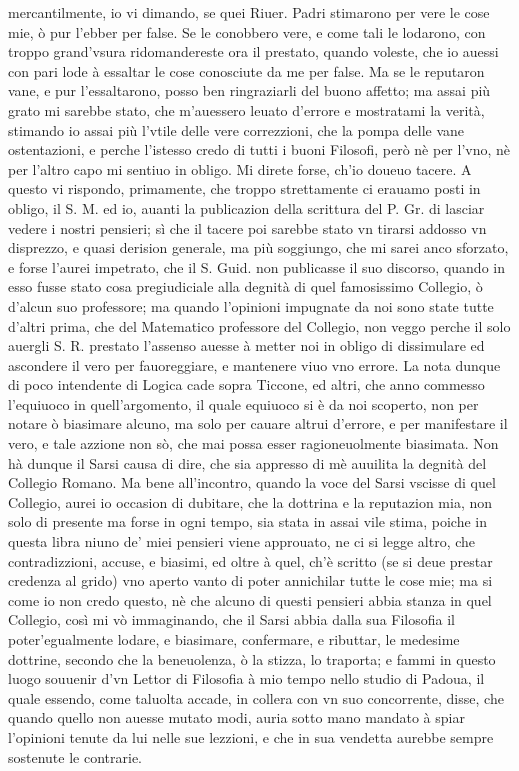 \documentclass[11pt,twoside,openany]{book}
\begin{document}
mercantilmente, io vi dimando, se quei Riuer. Padri stimarono per vere le cose mie, ò pur l'ebber per false. Se le conobbero vere, e come tali le lodarono, con troppo grand'vsura ridomandereste ora il prestato, quando voleste, che io auessi con pari lode à essaltar le cose conosciute da me per false. Ma se le reputaron vane, e pur l'essaltarono, posso ben ringraziarli del buono affetto; ma assai più grato mi sarebbe stato, che m'auessero leuato d'errore e mostratami la verità, stimando io assai più l'vtile delle vere correzzioni, che la pompa delle vane ostentazioni, e perche l'istesso credo di tutti i buoni Filosofi, però nè per l'vno, nè per l'altro capo mi sentiuo in obligo. Mi direte forse, ch'io doueuo tacere. A questo vi rispondo, primamente, che troppo strettamente ci erauamo posti in obligo, il S. M. ed io, auanti la publicazion della scrittura del P. Gr. di lasciar vedere i nostri pensieri; sì che il tacere poi sarebbe stato vn tirarsi addosso vn disprezzo, e quasi derision generale, ma più soggiungo, che mi sarei anco sforzato, e forse l'aurei impetrato, che il S. Guid. non publicasse il suo discorso, quando in esso fusse stato cosa pregiudiciale alla degnità di quel famosissimo Collegio, ò d'alcun suo professore; ma quando l'opinioni impugnate da noi sono state tutte d'altri prima, che del Matematico professore del Collegio, non veggo perche il solo auergli S. R. prestato l'assenso auesse à metter noi in obligo di dissimulare ed ascondere il vero per fauoreggiare, e mantenere viuo vno errore. La nota dunque di poco intendente di Logica cade sopra Ticcone, ed altri, che anno commesso l'equiuoco in quell'argomento, il quale equiuoco si è da noi scoperto, non per notare ò biasimare alcuno, ma solo per cauare altrui d'errore, e per manifestare il vero, e tale azzione non sò, che mai possa esser ragioneuolmente biasimata. Non hà dunque il Sarsi causa di dire, che sia appresso di mè auuilita la degnità del Collegio Romano. Ma bene all'incontro, quando la voce del Sarsi vscisse di quel Collegio, aurei io occasion di dubitare, che la dottrina e la reputazion mia, non solo di presente ma forse in ogni tempo, sia stata in assai vile stima, poiche in questa libra niuno de' miei pensieri viene approuato, ne ci si legge altro, che contradizzioni, accuse, e biasimi, ed oltre à quel, ch'è scritto (se si deue prestar credenza al grido) vno aperto vanto di poter annichilar tutte le cose mie; ma si come io non credo questo, nè che alcuno di questi pensieri abbia stanza in quel Collegio, così mi vò immaginando, che il Sarsi abbia dalla sua Filosofia il poter'egualmente lodare, e biasimare, confermare, e ributtar, le medesime dottrine, secondo che la beneuolenza, ò la stizza, lo traporta; e fammi in questo luogo souuenir d'vn Lettor di Filosofia à mio tempo nello studio di Padoua, il quale essendo, come taluolta accade, in collera con vn suo concorrente, disse, che quando quello non auesse mutato modi, auria sotto mano mandato à spiar l'opinioni tenute da lui nelle sue lezzioni, e che in sua vendetta aurebbe sempre sostenute le contrarie.
\end{document}

